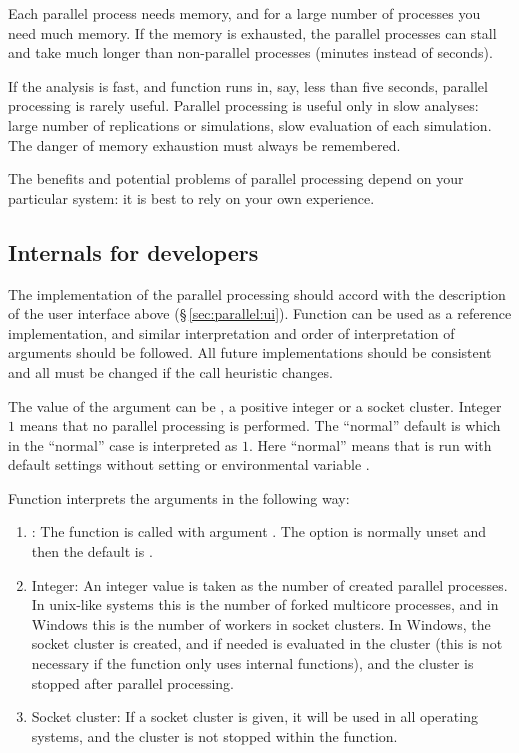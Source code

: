 \documentclass[a4paper,10pt,twocolumn]{article}
\begin{document}
Each parallel process needs memory, and for a large number of
processes you need much memory.  If the memory is exhausted, the
parallel processes can stall and  take much longer than
non-parallel processes (minutes instead of seconds).

If the analysis is fast, and function runs in, say, less than five
seconds, parallel processing is rarely useful.  Parallel processing is
useful only in slow analyses: large number of replications or
simulations, slow evaluation of each simulation. The danger of memory
exhaustion must always be remembered.

The benefits and potential problems of parallel processing depend on
your particular system: it is best to rely on your own experience. 

\subsection{Internals for developers}

The implementation of the parallel processing should accord with the
description of the user interface above (\S\,\ref{sec:parallel:ui}).
Function  can be used as a reference implementation,
and similar interpretation and order of interpretation of arguments
should be followed.  All future implementations should be consistent
and all must be changed if the call heuristic changes.

The value of the  argument can be , a
positive integer or a socket cluster.  Integer $1$ means that no
parallel processing is performed.  The ``normal'' default is
 which in  the ``normal'' case is interpreted as $1$.  Here
``normal'' means that \R{} is run with default settings without
setting  or environmental variable .  

Function  interprets the  arguments in
the following way:
\begin{enumerate} 
\item {}: The function is called with argument . The option  is normally
  unset and then the default is .  
\item Integer: An integer value is taken as the number of created
  parallel processes.  In unix-like systems this is the number of
  forked multicore processes, and in Windows this is the number of
  workers in socket clusters.  In Windows, the socket cluster is
  created, and if needed  is evaluated in the
  cluster (this is not necessary if the function only uses internal
  functions), and the cluster is stopped after parallel processing.
\item Socket cluster: If a socket cluster is given, it will be used in
  all operating systems, and  the cluster is not stopped
  within the function.
\end{enumerate}
\end{document}

